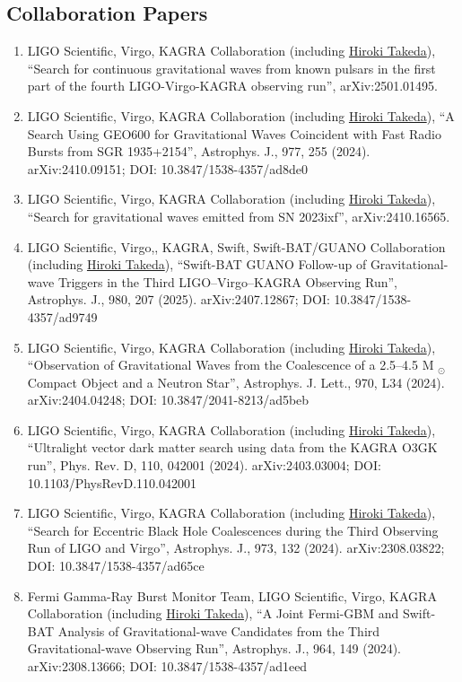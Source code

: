 \documentclass[uplatex, 12pt]{article}
\begin{document}
\subsection*{Collaboration Papers}
\begin{enumerate}
\item LIGO Scientific, Virgo, KAGRA Collaboration (including \uline{Hiroki Takeda}), “Search for continuous gravitational waves from known pulsars in the first part of the fourth LIGO-Virgo-KAGRA observing run”, arXiv:2501.01495.
\item LIGO Scientific, Virgo, KAGRA Collaboration (including \uline{Hiroki Takeda}), “A Search Using GEO600 for Gravitational Waves Coincident with Fast Radio Bursts from SGR 1935+2154”, Astrophys. J., 977, 255 (2024). arXiv:2410.09151; DOI: 10.3847/1538-4357/ad8de0
\item LIGO Scientific, Virgo, KAGRA Collaboration (including \uline{Hiroki Takeda}), “Search for gravitational waves emitted from SN 2023ixf”, arXiv:2410.16565.
\item LIGO Scientific, Virgo,, KAGRA, Swift, Swift-BAT/GUANO Collaboration (including \uline{Hiroki Takeda}), “Swift-BAT GUANO Follow-up of Gravitational-wave Triggers in the Third LIGO–Virgo–KAGRA Observing Run”, Astrophys. J., 980, 207 (2025). arXiv:2407.12867; DOI: 10.3847/1538-4357/ad9749
\item LIGO Scientific, Virgo, KAGRA Collaboration (including \uline{Hiroki Takeda}), “Observation of Gravitational Waves from the Coalescence of a 2.5–4.5 M $_⊙$ Compact Object and a Neutron Star”, Astrophys. J. Lett., 970, L34 (2024). arXiv:2404.04248; DOI: 10.3847/2041-8213/ad5beb
\item LIGO Scientific, Virgo, KAGRA Collaboration (including \uline{Hiroki Takeda}), “Ultralight vector dark matter search using data from the KAGRA O3GK run”, Phys. Rev. D, 110, 042001 (2024). arXiv:2403.03004; DOI: 10.1103/PhysRevD.110.042001
\item LIGO Scientific, Virgo, KAGRA Collaboration (including \uline{Hiroki Takeda}), “Search for Eccentric Black Hole Coalescences during the Third Observing Run of LIGO and Virgo”, Astrophys. J., 973, 132 (2024). arXiv:2308.03822; DOI: 10.3847/1538-4357/ad65ce
\item Fermi Gamma-Ray Burst Monitor Team, LIGO Scientific, Virgo, KAGRA Collaboration (including \uline{Hiroki Takeda}), “A Joint Fermi-GBM and Swift-BAT Analysis of Gravitational-wave Candidates from the Third Gravitational-wave Observing Run”, Astrophys. J., 964, 149 (2024). arXiv:2308.13666; DOI: 10.3847/1538-4357/ad1eed

\end{enumerate}
\end{document}
